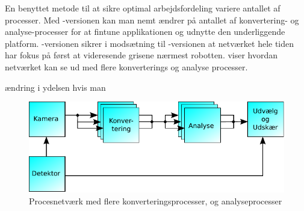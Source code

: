 En benyttet metode til at sikre optimal arbejdsfordeling variere  antallet af processer. Med -versionen kan man nemt ændrer på antallet af konvertering- og analyse-processer for at fintune applikationen og  udnytte den underliggende platform. -versionen sikrer i modsætning til -versionen at netværket hele tiden har fokus på først at videresende grisene nærmest robotten.  viser hvordan netværket kan se ud med flere konverterings og analyse processer. 

ændring i ydelsen hvis man

\begin{figure}
 \begin{center}
  \includegraphics[scale=1]{images/pig-network3}
	\caption{Procesnetværk med flere konverteringsprocesser, og analyseprocesser}
	\label{fig:pig-network3}
\end{center}
\end{figure}

 
 
 
